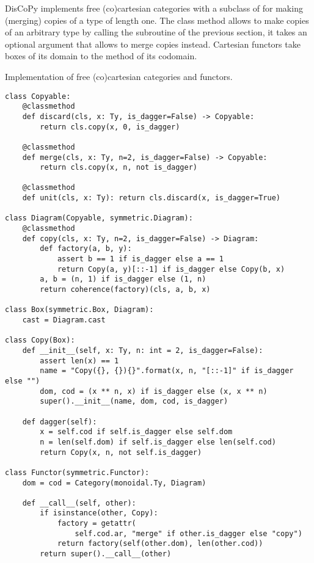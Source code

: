 DisCoPy implements free (co)cartesian categories with a subclass of  for making (merging)  copies of a type  of length one.
The class method  allows to make  copies of an arbitrary type  by calling the  subroutine of the previous section, it takes an optional argument  that allows to merge copies instead.
Cartesian functors take  boxes of its domain to the  method of its codomain.

\begin{python}
{\normalfont Implementation of free (co)cartesian categories and functors.}

\begin{verbatim}
class Copyable:
    @classmethod
    def discard(cls, x: Ty, is_dagger=False) -> Copyable:
        return cls.copy(x, 0, is_dagger)

    @classmethod
    def merge(cls, x: Ty, n=2, is_dagger=False) -> Copyable:
        return cls.copy(x, n, not is_dagger)

    @classmethod
    def unit(cls, x: Ty): return cls.discard(x, is_dagger=True)

class Diagram(Copyable, symmetric.Diagram):
    @classmethod
    def copy(cls, x: Ty, n=2, is_dagger=False) -> Diagram:
        def factory(a, b, y):
            assert b == 1 if is_dagger else a == 1
            return Copy(a, y)[::-1] if is_dagger else Copy(b, x)
        a, b = (n, 1) if is_dagger else (1, n)
        return coherence(factory)(cls, a, b, x)

class Box(symmetric.Box, Diagram):
    cast = Diagram.cast

class Copy(Box):
    def __init__(self, x: Ty, n: int = 2, is_dagger=False):
        assert len(x) == 1
        name = "Copy({}, {}){}".format(x, n, "[::-1]" if is_dagger else "")
        dom, cod = (x ** n, x) if is_dagger else (x, x ** n)
        super().__init__(name, dom, cod, is_dagger)

    def dagger(self):
        x = self.cod if self.is_dagger else self.dom
        n = len(self.dom) if self.is_dagger else len(self.cod)
        return Copy(x, n, not self.is_dagger)

class Functor(symmetric.Functor):
    dom = cod = Category(monoidal.Ty, Diagram)

    def __call__(self, other):
        if isinstance(other, Copy):
            factory = getattr(
                self.cod.ar, "merge" if other.is_dagger else "copy")
            return factory(self(other.dom), len(other.cod))
        return super().__call__(other)
\end{verbatim}
\end{python}

